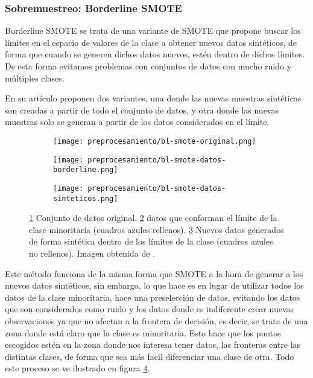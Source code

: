 \subsubsection{Sobremuestreo: Borderline SMOTE}

Borderline SMOTE \cite{BL-SMOTE} se trata de una variante de SMOTE que propone buscar los límites en el espacio de valores de la clase a obtener nuevos datos sintéticos, de forma que cuando se generen dichos datos nuevos, estén dentro de dichos límites. De esta forma evitamos problemas con conjuntos de datos con mucho ruido y múltiples clases.

En su artículo proponen dos variantes, una donde las nuevas muestras sintéticas son creadas a partir de todo el conjunto de datos, y otra donde las nuevas muestras solo se generan a partir de los datos considerados en el límite.


\begin{figure}[H]
    \centering
    \begin{subfigure}[b]{0.33\textwidth}
		  \texttt{[image: preprocesamiento/bl-smote-original.png]}
        \caption{}
        \label{fig:blSMOTE-orig}
    \end{subfigure}
    \begin{subfigure}[b]{0.33\textwidth}
        \texttt{[image: preprocesamiento/bl-smote-datos-borderline.png]}
        \caption{}
        \label{fig:blSMOTE-border}
    \end{subfigure}
    \begin{subfigure}[b]{0.33\textwidth}
        \texttt{[image: preprocesamiento/bl-smote-datos-sinteticos.png]}
        \caption{}
        \label{fig:blSMOTE-sintetico}
    \end{subfigure}

    \caption{\ref{fig:blSMOTE-orig} Conjunto de datos original. \ref{fig:blSMOTE-border} datos que conforman el límite de la clase minoritaria (cuadros azules rellenos). \ref{fig:blSMOTE-sintetico} Nuevos datos generados de forma sintética dentro de los límites de la clase (cuadros azules no rellenos). Imagen obtenida de \cite{BL-SMOTE}.}
	 \label{fig:ejemploBL-SMOTE}

\end{figure}

Este método funciona de la misma forma que SMOTE a la hora de generar a los nuevos datos sintéticos, sin embargo, lo que hace es en lugar de utilizar todos los datos de la clase minoritaria, hace una preselección de datos, evitando los datos que son considerados como ruido y los datos donde es indiferente crear nuevas observaciones ya que no afectan a la frontera de decisión, es decir, se trata de una zona donde está claro que la clase es minoritaria. Esto hace que los puntos escogidos estén en la zona donde nos interesa tener datos, las fronteras entre las distintas clases, de forma que sea más facil diferenciar una clase de otra. Todo este proceso se ve ilustrado en figura \ref{fig:ejemploBL-SMOTE}.


